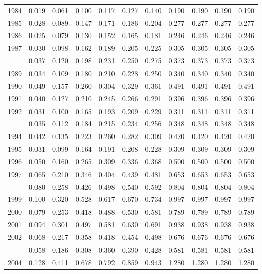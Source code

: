 \documentclass[
]{article}
\begin{document}
\begin{longtable}[t]{lrrrrrrrrrr}
1984 & 0.019 & 0.061 & 0.100 & 0.117 & 0.127 & 0.140 & 0.190 & 0.190 & 0.190 & 0.190\\
1985 & 0.028 & 0.089 & 0.147 & 0.171 & 0.186 & 0.204 & 0.277 & 0.277 & 0.277 & 0.277\\
1986 & 0.025 & 0.079 & 0.130 & 0.152 & 0.165 & 0.181 & 0.246 & 0.246 & 0.246 & 0.246\\
1987 & 0.030 & 0.098 & 0.162 & 0.189 & 0.205 & 0.225 & 0.305 & 0.305 & 0.305 & 0.305\\
\addlinespace
1988 & 0.037 & 0.120 & 0.198 & 0.231 & 0.250 & 0.275 & 0.373 & 0.373 & 0.373 & 0.373\\
1989 & 0.034 & 0.109 & 0.180 & 0.210 & 0.228 & 0.250 & 0.340 & 0.340 & 0.340 & 0.340\\
1990 & 0.049 & 0.157 & 0.260 & 0.304 & 0.329 & 0.361 & 0.491 & 0.491 & 0.491 & 0.491\\
1991 & 0.040 & 0.127 & 0.210 & 0.245 & 0.266 & 0.291 & 0.396 & 0.396 & 0.396 & 0.396\\
1992 & 0.031 & 0.100 & 0.165 & 0.193 & 0.209 & 0.229 & 0.311 & 0.311 & 0.311 & 0.311\\
\addlinespace
1993 & 0.035 & 0.112 & 0.184 & 0.215 & 0.234 & 0.256 & 0.348 & 0.348 & 0.348 & 0.348\\
1994 & 0.042 & 0.135 & 0.223 & 0.260 & 0.282 & 0.309 & 0.420 & 0.420 & 0.420 & 0.420\\
1995 & 0.031 & 0.099 & 0.164 & 0.191 & 0.208 & 0.228 & 0.309 & 0.309 & 0.309 & 0.309\\
1996 & 0.050 & 0.160 & 0.265 & 0.309 & 0.336 & 0.368 & 0.500 & 0.500 & 0.500 & 0.500\\
1997 & 0.065 & 0.210 & 0.346 & 0.404 & 0.439 & 0.481 & 0.653 & 0.653 & 0.653 & 0.653\\
\addlinespace
1998 & 0.080 & 0.258 & 0.426 & 0.498 & 0.540 & 0.592 & 0.804 & 0.804 & 0.804 & 0.804\\
1999 & 0.100 & 0.320 & 0.528 & 0.617 & 0.670 & 0.734 & 0.997 & 0.997 & 0.997 & 0.997\\
2000 & 0.079 & 0.253 & 0.418 & 0.488 & 0.530 & 0.581 & 0.789 & 0.789 & 0.789 & 0.789\\
2001 & 0.094 & 0.301 & 0.497 & 0.581 & 0.630 & 0.691 & 0.938 & 0.938 & 0.938 & 0.938\\
2002 & 0.068 & 0.217 & 0.358 & 0.418 & 0.454 & 0.498 & 0.676 & 0.676 & 0.676 & 0.676\\
\addlinespace
2003 & 0.058 & 0.186 & 0.308 & 0.360 & 0.390 & 0.428 & 0.581 & 0.581 & 0.581 & 0.581\\
2004 & 0.128 & 0.411 & 0.678 & 0.792 & 0.859 & 0.943 & 1.280 & 1.280 & 1.280 & 1.280\\

\end{longtable}
\end{document}
